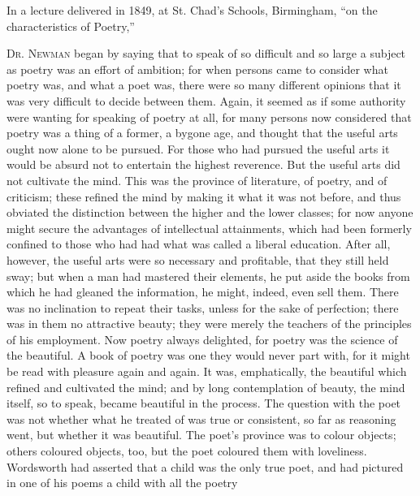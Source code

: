 


In a lecture delivered in 1849, at St. Chad's
Schools,
Birmingham, ``on the characteristics of Poetry,''

D\textsc{r}. N\textsc{ewman}
began by saying that to speak of so difficult and so large a subject
as poetry was an effort of ambition; for when persons came to consider
what poetry was, and what a poet was, there were so many different
opinions that it was very difficult to decide between them. Again, it
seemed as if some authority were wanting for speaking of poetry at
all, for many persons now considered that poetry was a thing of a
former, a bygone age, and thought that the useful arts ought now alone
to be pursued. For those who had pursued the useful arts it would be
absurd not to entertain the highest reverence. But the useful arts did
not cultivate the mind. This was the province of literature, of
poetry, and of criticism; these refined the mind by making it what it
was not before, and thus obviated the distinction between the higher
and the lower classes; for now anyone might secure the advantages of
intellectual attainments, which had been formerly confined to those
who had had what was called a liberal education. After all, however,
the useful arts were so necessary and profitable, that they still held
sway; but when a man had mastered their elements, he put aside the
books from which he had gleaned the information, he might, indeed,
even sell them. There was no inclination to repeat their tasks, unless
for the sake of perfection; there was in them no attractive
beauty; they were merely the teachers of the principles of his
employment. Now poetry always delighted, for poetry was the science of
the beautiful. A book of poetry was one they would never part with,
for it might be read with pleasure again and again. It was,
emphatically, the beautiful which refined and cultivated the mind; and
by long contemplation of beauty, the mind itself, so to speak, became
beautiful in the process. The question with the poet was not whether
what he treated of was true or consistent, so far as reasoning went,
but whether it was beautiful. The poet's province was to colour
objects; others coloured objects, too, but the poet coloured them with
loveliness. Wordsworth had asserted that a child was the only true
poet, and had pictured in one of his poems a child with all the poetry
